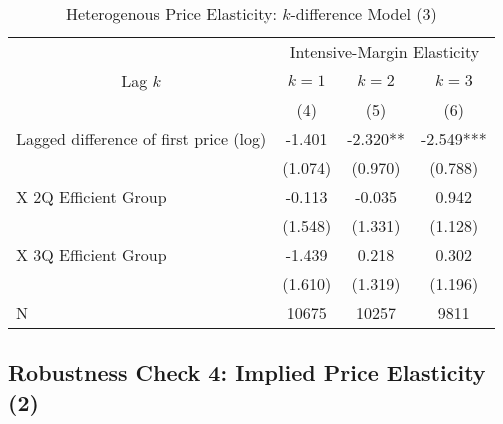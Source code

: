 \documentclass[ review  , 3p ]{elsarticle}
\begin{document}
  \begin{table}
  
  \caption{\label{tab:kableHeterokDiffElasticitySlide3}Heterogenous Price Elasticity: $k$-difference Model (3)}
  \centering
  \fontsize{8}{10}\selectfont
  \begin{tabular}[t]{lccc}
  \toprule
  \multicolumn{1}{c}{ } & \multicolumn{3}{c}{Intensive-Margin Elasticity} \\
  \cmidrule(l{3pt}r{3pt}){2-4}
  \multicolumn{1}{c}{Lag $k$} & \multicolumn{1}{c}{$k = 1$} & \multicolumn{1}{c}{$k = 2$} & \multicolumn{1}{c}{$k = 3$} \\
  \cmidrule(l{3pt}r{3pt}){1-1} \cmidrule(l{3pt}r{3pt}){2-2} \cmidrule(l{3pt}r{3pt}){3-3} \cmidrule(l{3pt}r{3pt}){4-4}
   & (4) & (5) & (6)\\
  \midrule
  Lagged difference of first price (log) & -1.401 & -2.320** & -2.549***\\
   & (1.074) & (0.970) & (0.788)\\
  \hspace{1em}X 2Q Efficient Group & -0.113 & -0.035 & 0.942\\
   & (1.548) & (1.331) & (1.128)\\
  \hspace{1em}X 3Q Efficient Group & -1.439 & 0.218 & 0.302\\
   & (1.610) & (1.319) & (1.196)\\
  N & 10675 & 10257 & 9811\\
  \bottomrule
  \end{tabular}
  \end{table}
  
  \hypertarget{robustness-check-4-implied-price-elasticity-2}{%
  \subsection{Robustness Check 4: Implied Price Elasticity (2)}\label{robustness-check-4-implied-price-elasticity-2}}
  
\end{document}
